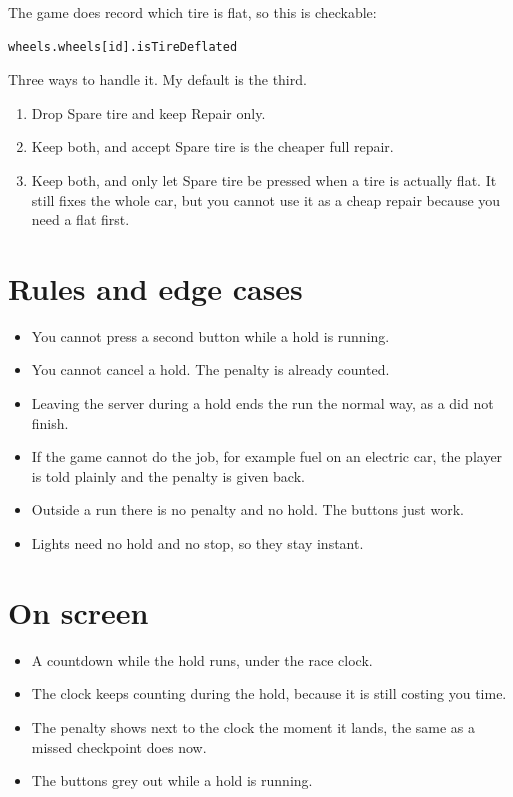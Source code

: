 \documentclass[11pt,a4paper]{article}
\begin{document}
The game does record which tire is flat, so this is checkable:

\begin{lstlisting}
wheels.wheels[id].isTireDeflated
\end{lstlisting}

Three ways to handle it. My default is the third.

\begin{enumerate}
  \item Drop Spare tire and keep Repair only.
  \item Keep both, and accept Spare tire is the cheaper full repair.
  \item Keep both, and only let Spare tire be pressed when a tire is actually
        flat. It still fixes the whole car, but you cannot use it as a cheap
        repair because you need a flat first.
\end{enumerate}

\section{Rules and edge cases}

\begin{itemize}
  \item You cannot press a second button while a hold is running.
  \item You cannot cancel a hold. The penalty is already counted.
  \item Leaving the server during a hold ends the run the normal way, as a did
        not finish.
  \item If the game cannot do the job, for example fuel on an electric car,
        the player is told plainly and the penalty is given back.
  \item Outside a run there is no penalty and no hold. The buttons just work.
  \item Lights need no hold and no stop, so they stay instant.
\end{itemize}

\section{On screen}

\begin{itemize}
  \item A countdown while the hold runs, under the race clock.
  \item The clock keeps counting during the hold, because it is still costing
        you time.
  \item The penalty shows next to the clock the moment it lands, the same as a
        missed checkpoint does now.
  \item The buttons grey out while a hold is running.
\end{itemize}
\end{document}
